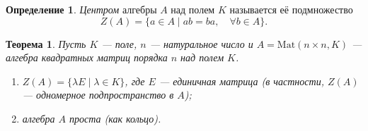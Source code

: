 \documentclass[a4paper]{article}
\theoremstyle{plain}
\newtheorem*{theorem}{Теорема}
\theoremstyle{definition}
\newtheorem{definition}{Определение}
\numberwithin{definition}{section}
\numberwithin{proposal}{section}
\begin{document}
\begin{definition}
\emph{Центром} алгебры \(A\) над полем \(K\) называется её подмножество
\begin{equation*}
	Z(A) = \{a \in A \;|\; ab = ba, \quad \forall b \in A\}.
\end{equation*}
\end{definition}

\begin{theorem}
Пусть \(K\) --- поле, \(n\) --- натуральное число и \(A = \mathrm{Mat}(n \times n, K)\) --- алгебра квадратных матриц порядка \(n\) над полем \(K\).
\begin{enumerate}
	\item \(Z(A) = \{\lambda{}E \;|\; \lambda \in K\}\), где \(E\) --- единичная матрица (в частности, \(Z(A)\) --- одномерное подпространство в \(A\));
	\item алгебра \(A\) проста (как кольцо).
\end{enumerate}
\end{theorem}
\end{document}
